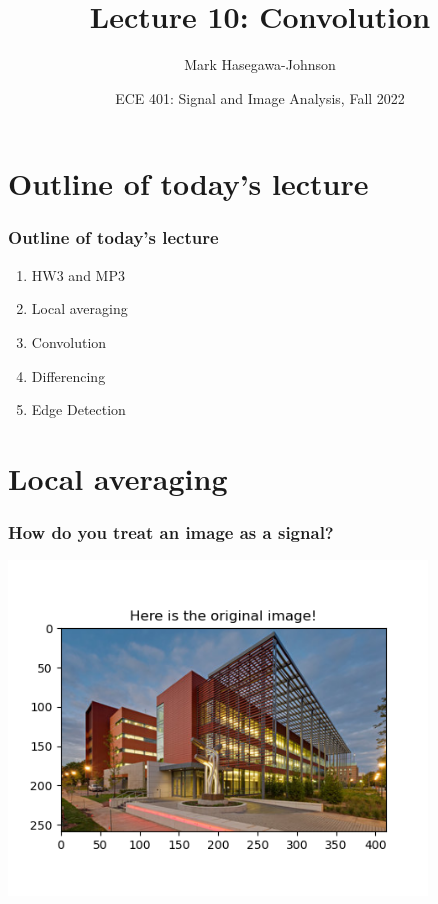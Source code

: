\documentclass{beamer}
\title{Lecture 10: Convolution}
\author{Mark Hasegawa-Johnson}
\date{ECE 401: Signal and Image Analysis, Fall 2022}
\begin{document}
\begin{frame}
  \maketitle
\end{frame}

\begin{frame}
  \tableofcontents
\end{frame}

\section[Outline]{Outline of today's lecture}
\setcounter{subsection}{1}
\begin{frame}
  \frametitle{Outline of today's lecture}
  \begin{enumerate}
  \item HW3 and MP3
  \item Local averaging
  \item Convolution
  \item Differencing
  \item Edge Detection
  \end{enumerate}
\end{frame}

\section[Averaging]{Local averaging}
\setcounter{subsection}{1}

\begin{frame}
  \frametitle{How do you treat an image as a signal?}
  \centerline{\includegraphics[height=3.5in]{mp3fig1.png}}
\end{frame}
\end{document}
